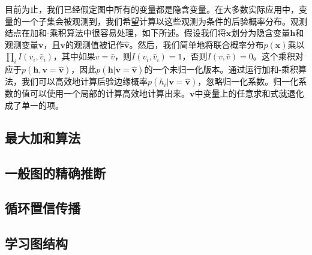 目前为止，我们已经假定图中所有的变量都是隐含变量。在大多数实际应用中，变量的一个子集会被观测到，我们希望计算以这些观测为条件的后验概率分布。观测结点在加和-乘积算法中很容易处理，如下所述。假设我们将$\boldsymbol{x}$划分为隐含变量$\boldsymbol{h}$和观测变量$\boldsymbol{v}$，且$\boldsymbol{v}$的观测值被记作$\hat{\boldsymbol{v}}$。然后，我们简单地将联合概率分布$p(\boldsymbol{x})$乘以$\prod_iI(v_i,\hat{v}_i)$，其中如果$v=\hat{v}$，则$I(v_i,\hat{v}_i)=1$，否则$I(v,\hat{v})=0$。这个乘积对应于$p(\boldsymbol{h},\boldsymbol{v}=\hat{\boldsymbol{v}})$，因此$p(\boldsymbol{h}|\boldsymbol{v}=\hat{\boldsymbol{v}})$的一个未归一化版本。通过运行加和-乘积算法，我们可以高效地计算后验边缘概率$p(h_i|\boldsymbol{v}=\hat{\boldsymbol{v}})$，忽略归一化系数。归一化系数的值可以使用一个局部的计算高效地计算出来。$\boldsymbol{v}$中变量上的任意求和式就退化成了单一的项。
\subsection*{最大加和算法}
\subsection*{一般图的精确推断}
\subsection*{循环置信传播}
\subsection*{学习图结构}